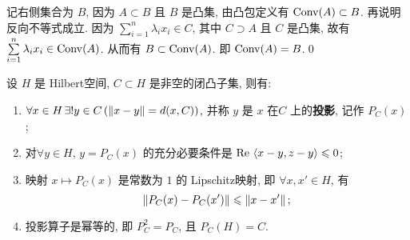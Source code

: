 	\begin{Proof}
		记右侧集合为 $ B $, 因为 $ A\subset B $ 且 $ B $ 是凸集, 由凸包定义有 $ \operatorname{Conv}(A)\subset B $. 再说明反向不等式成立. 因为 $ \sum\limits_{i=1}^{n}\lambda_{i}x_{i}\in C $, 其中 $ C\supset A $ 且 $ C $ 是凸集, 故有 $ \sum\limits_{i=1}^{n}\lambda_{i}x_{i}\in\operatorname{Conv}(A) $. 从而有 $ B\subset\operatorname{Conv}(A) $. 即 $ \operatorname{Conv}(A)=B $.\qed
	\end{Proof}

	\begin{Theorem}[闭凸集投影定理]\label{thm:闭凸集投影定理}
		设 $ H $ 是 Hilbert空间, $ C\subset H $ 是非空的闭凸子集, 则有:
		\begin{enumerate}[(1)]
			\item $ \forall x\in H\,\exists!y\in C\,(\left\| x-y \right\|=d(x, C)) $, 并称 $ y $ 是 $ x $ 在$ C $ 上的\textbf{投影}, 记作 $ P_{C}(x) $;
			\item 对$ \forall y\in H $, $ y=P_{C}(x) $ 的充分必要条件是 $ \mathrm{Re\,}\left\langle x-y, z-y \right\rangle\leqslant0 $;
			\item 映射 $ x\mapsto P_{C}(x) $ 是常数为 $ 1 $ 的 Lipschitz映射, 即 $ \forall x, x'\in H $, 有
			\[
				\left\| P_{C}(x)-P_{C}(x') \right\|\leqslant \left\| x-x' \right\|;
			\]
			\item 投影算子是幂等的, 即 $ P^{2}_{C}=P_{C} $, 且 $ P_{C}(H)=C $. 
		\end{enumerate}
	\end{Theorem}
	
